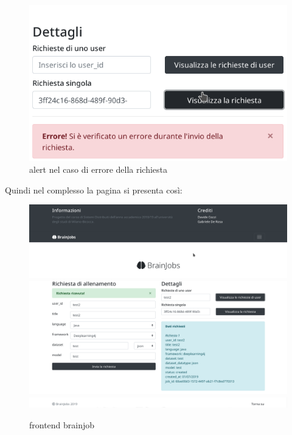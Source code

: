 \documentclass[a4paper,12pt, oneside]{book}
\begin{document}
\begin{figure}[H]
  \centering
  \includegraphics[scale = 0.7]{img/err-job.png}
  \caption{alert nel caso di errore della richiesta}
\end{figure}
\newpage
Quindi nel complesso la pagina si presenta così:
\begin{figure}[H]
  \centering
  \includegraphics[scale = 0.4]{img/pagina1.png}
  \includegraphics[scale = 0.4]{img/pagina2.png}
  \includegraphics[scale = 0.4]{img/pagina3.png}
  \caption{frontend brainjob}
\end{figure}
\end{document}
